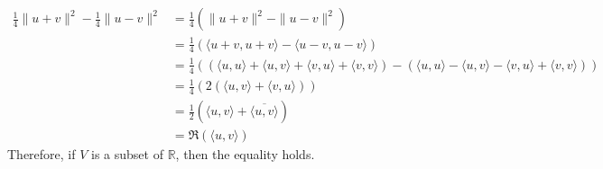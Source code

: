 \documentclass[fleqn, a4paper, 11pt, oneside]{amsart}
\theoremstyle{definition}
\theoremstyle{theorem}
\begin{document}
\begin{solution}
	\begin{align*}
		\frac{1}{4} \|u + v\|^2 - \frac{1}{4} \|u - v\|^2 & = \frac{1}{4} \left( \|u + v\|^2 - \|u - v\|^2 \right)                                                                                                                                                                                    \\
                                                                  & = \frac{1}{4} \left( \langle u + v , u + v \rangle - \langle u - v , u - v \rangle \right)                                                                                                                                                \\
                                                                  & = \frac{1}{4} \left( \left( \langle u,u \rangle  + \langle u,v \rangle + \langle v,u \rangle + \langle v,v \rangle \right) - \left( \langle u,u \rangle - \langle u,v \rangle - \langle v,u \rangle + \langle v,v \rangle \right) \right) \\
                                                                  & = \frac{1}{4} \left( 2 \left( \langle u,v \rangle + \langle v,u \rangle \right) \right)                                                                                                                                                   \\
                                                                  & = \frac{1}{2} \left( \langle u,v \rangle + \overline{\langle u,v \rangle} \right)                                                                                                                                                         \\
                                                                  & = \Re\left( \langle u,v \rangle \right)
	\end{align*}
	Therefore, if $V$ is a subset of $\mathbb{R}$, then the equality holds.
\end{solution}
\end{document}
